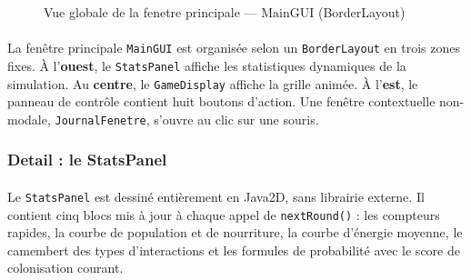 \begin{figure}[h!]
\begin{center}
\end{center}
\caption{Vue globale de la fenetre principale --- MainGUI (BorderLayout)}
\label{fig:ihm_global}
\end{figure}

\paragraph{} La fenêtre principale \texttt{MainGUI} est organisée selon un \texttt{BorderLayout} en trois zones fixes. À l'\textbf{ouest}, le \texttt{StatsPanel} affiche les statistiques dynamiques de la simulation. Au \textbf{centre}, le \texttt{GameDisplay} affiche la grille animée. À l'\textbf{est}, le panneau de contrôle contient huit boutons d'action. Une fenêtre contextuelle non-modale, \texttt{JournalFenetre}, s'ouvre au clic sur une souris.

\subsubsection{Detail : le StatsPanel}

\paragraph{} Le \texttt{StatsPanel} est dessiné entièrement en Java2D, sans librairie externe. Il contient cinq blocs mis à jour à chaque appel de \texttt{nextRound()} : les compteurs rapides, la courbe de population et de nourriture, la courbe d'énergie moyenne, le camembert des types d'interactions et les formules de probabilité avec le score de colonisation courant.

